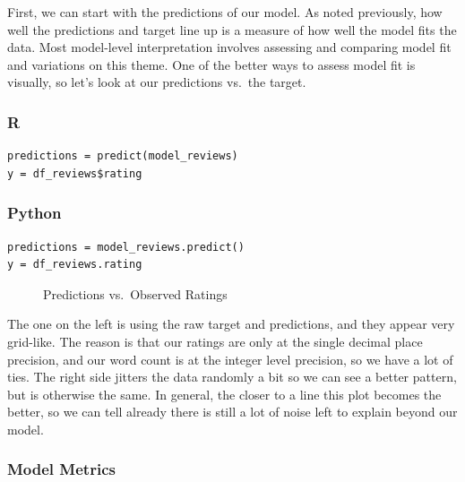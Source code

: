 \documentclass[
  letterpaper,
]{krantz}
\begin{document}
First, we can start with the predictions of our model. As noted
previously, how well the predictions and target line up is a measure of
how well the model fits the data. Most model-level interpretation
involves assessing and comparing model fit and variations on this theme.
One of the better ways to assess model fit is visually, so let's look at
our predictions vs.~the target.

\subsubsection{R}

\begin{verbatim}
predictions = predict(model_reviews)
y = df_reviews$rating
\end{verbatim}

\subsubsection{Python}

\begin{verbatim}
predictions = model_reviews.predict()
y = df_reviews.rating
\end{verbatim}

\begin{figure}[H]


\caption{\label{fig-pp-scatter}Predictions vs.~Observed Ratings}

\end{figure}%

The one on the left is using the raw target and predictions, and they
appear very grid-like. The reason is that our ratings are only at the
single decimal place precision, and our word count is at the integer
level precision, so we have a lot of ties. The right side jitters the
data randomly a bit so we can see a better pattern, but is otherwise the
same. In general, the closer to a line this plot becomes the better, so
we can tell already there is still a lot of noise left to explain beyond
our model.

\subsubsection{Model Metrics}\label{sec-lm-interpretation-model-metrics}
\end{document}
